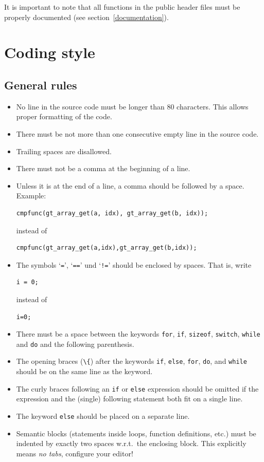 \documentclass[11pt,final]{article}
\newcommand{\keyword}[1]{\lstinline{#1}}
\begin{document}
It is important to note that all functions in the public header files must be
properly documented (see section~\ref{documentation}).

\section{Coding style}

\subsection{General rules}
\begin{itemize}
\item
No line in the source code must be longer than 80 characters.
This allows proper formatting of the code.
\item
There must be not more than one consecutive empty line in the source code.
\item
Trailing spaces are disallowed.
\item
There must not be a comma at the beginning of a line.
\item
Unless it is at the end of a line, a comma should be followed by a space.
Example:

\begin{lstlisting}
cmpfunc(gt_array_get(a, idx), gt_array_get(b, idx));
\end{lstlisting}

instead of

\begin{lstlisting}
cmpfunc(gt_array_get(a,idx),gt_array_get(b,idx));
\end{lstlisting}

\item
The symbols `\keyword{=}', `\keyword{==}' und `\keyword{!=}' should be
enclosed by spaces. That is, write

\begin{lstlisting}
i = 0;
\end{lstlisting}

instead of

\begin{lstlisting}
i=0;
\end{lstlisting}
\item
There must be a space between the keywords \keyword{for}, \keyword{if},
\keyword{sizeof}, \keyword{switch}, \keyword{while} and \keyword{do} and the
following parenthesis.
\item
The opening braces (\keyword{\{}) after the keywords \keyword{if},
\keyword{else}, \keyword{for}, \keyword{do}, and \keyword{while} should be on
the same line as the keyword.
\item
The curly braces following an \keyword{if} or \keyword{else} expression should
be omitted if the expression and the (single) following statement both fit on
a single line.
\item
The keyword \keyword{else} should be placed on a separate line.
\item
Semantic blocks (statements inside loops, function definitions, etc.) must be
indented by exactly two spaces w.r.t.\ the enclosing block.
This explicitly means \emph{no tabs}, configure your editor!


\end{itemize}
\end{document}
